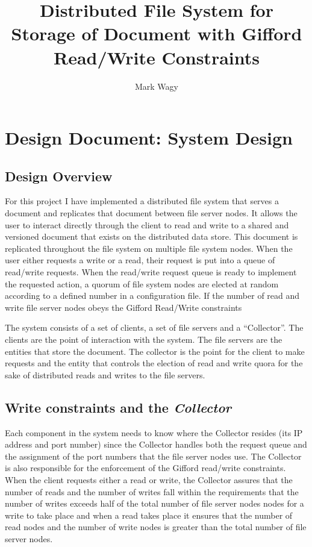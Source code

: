 \documentclass
[english,a4paper]{article}
\begin{document}
\title{Distributed File System for Storage of Document with Gifford
  Read/Write Constraints}
\author{Mark Wagy}

\maketitle

\newpage
\section{Design Document: System Design}

\subsection{Design Overview}
For this project I have implemented a distributed file system that
serves a document and replicates that document between file server
nodes. It allows the user to interact directly through the client to
read and write to a shared and 
versioned document that exists on the distributed data store. This
document is replicated throughout the file system on multiple file
system nodes. When the user either requests a write or a read, their
request is put into a queue of read/write requests. When the
read/write request queue is ready to implement the requested action,
a quorum of file system nodes are elected at random according to a
defined number in a configuration file. If the number of read and
write file server nodes obeys the Gifford Read/Write constraints \cite{gifford_weighted_1979}

The system consists of a set of clients, a set of file servers and a
``Collector''. The clients are the point of interaction with the
system. The file servers are the entities that store the document. The
collector is the point for the client to make requests and the entity
that controls the election of read and write quora for the sake of
distributed reads and writes to the file servers.

\subsection{Write constraints and the \emph{Collector}}
Each component in the system needs to know where the Collector resides
(its IP address and port number) since the Collector handles both the
request queue and the assignment of the port numbers that the file
server nodes use. The Collector is also responsible for the
enforcement of the Gifford read/write constraints. When the client
requests either a read or write, the Collector assures that the number
of reads and the number of writes fall within the requirements that
the number of writes exceeds half of the total number of file server
nodes nodes for a write to take place and when a read takes place it
ensures that the number of read nodes and the number of write nodes is
greater than the total number of file server nodes.
\end{document}
